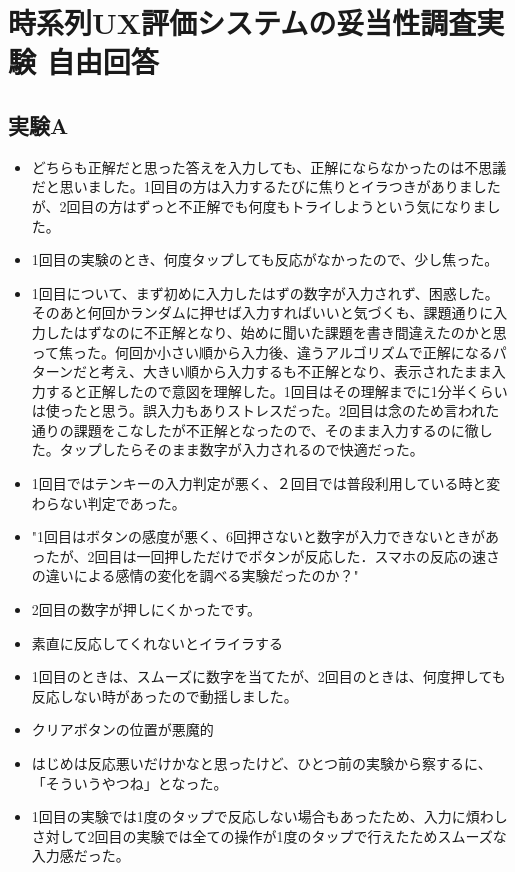 \chapter{時系列UX評価システムの妥当性調査実験 自由回答}

\section{実験A}

\begin{itemize}
  \item どちらも正解だと思った答えを入力しても、正解にならなかったのは不思議だと思いました。1回目の方は入力するたびに焦りとイラつきがありましたが、2回目の方はずっと不正解でも何度もトライしようという気になりました。
  \item 1回目の実験のとき、何度タップしても反応がなかったので、少し焦った。
  \item 1回目について、まず初めに入力したはずの数字が入力されず、困惑した。そのあと何回かランダムに押せば入力すればいいと気づくも、課題通りに入力したはずなのに不正解となり、始めに聞いた課題を書き間違えたのかと思って焦った。何回か小さい順から入力後、違うアルゴリズムで正解になるパターンだと考え、大きい順から入力するも不正解となり、表示されたまま入力すると正解したので意図を理解した。1回目はその理解までに1分半くらいは使ったと思う。誤入力もありストレスだった。2回目は念のため言われた通りの課題をこなしたが不正解となったので、そのまま入力するのに徹した。タップしたらそのまま数字が入力されるので快適だった。
  \item 1回目ではテンキーの入力判定が悪く、２回目では普段利用している時と変わらない判定であった。
  \item "1回目はボタンの感度が悪く、6回押さないと数字が入力できないときがあったが、2回目は一回押しただけでボタンが反応した．スマホの反応の速さの違いによる感情の変化を調べる実験だったのか？"
  \item 2回目の数字が押しにくかったです。
  \item 素直に反応してくれないとイライラする
  \item 1回目のときは、スムーズに数字を当てたが、2回目のときは、何度押しても反応しない時があったので動揺しました。
  \item クリアボタンの位置が悪魔的
  \item はじめは反応悪いだけかなと思ったけど、ひとつ前の実験から察するに、「そういうやつね」となった。
  \item 1回目の実験では1度のタップで反応しない場合もあったため、入力に煩わしさ対して2回目の実験では全ての操作が1度のタップで行えたためスムーズな入力感だった。

\end{itemize}
